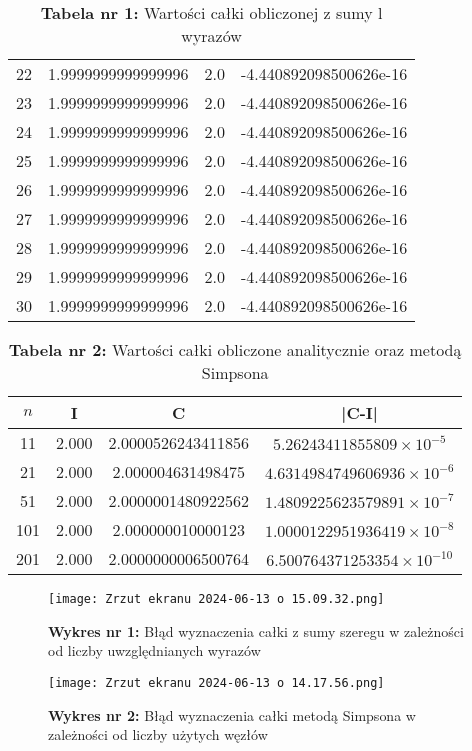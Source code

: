 \documentclass{article}
\begin{document}
\begin{table}[h!]
\begin{tabular}{cccc}
22 & 1.9999999999999996 & 2.0 & -4.440892098500626e-16 \\
23 & 1.9999999999999996 & 2.0 & -4.440892098500626e-16 \\
24 & 1.9999999999999996 & 2.0 & -4.440892098500626e-16 \\
25 & 1.9999999999999996 & 2.0 & -4.440892098500626e-16 \\
26 & 1.9999999999999996 & 2.0 & -4.440892098500626e-16 \\
27 & 1.9999999999999996 & 2.0 & -4.440892098500626e-16 \\
28 & 1.9999999999999996 & 2.0 & -4.440892098500626e-16 \\
29 & 1.9999999999999996 & 2.0 & -4.440892098500626e-16 \\
30 & 1.9999999999999996 & 2.0 & -4.440892098500626e-16 \\
\bottomrule
\end{tabular}
\caption*{\textbf{Tabela nr 1:} Wartości całki obliczonej z sumy l wyrazów}
\end{table}

\begin{table}[h!]
\centering
\begin{tabular}{cccc}
\toprule
\(n\) & I & C & |C-I| \\
\midrule
11 & 2.000 & 2.0000526243411856 & \(5.26243411855809 \times 10^{-5}\) \\
21 & 2.000 & 2.000004631498475 & \(4.6314984749606936 \times 10^{-6}\) \\
51 & 2.000 & 2.0000001480922562 & \(1.4809225623579891 \times 10^{-7}\) \\
101 & 2.000 & 2.000000010000123 & \(1.0000122951936419 \times 10^{-8}\) \\
201 & 2.000 & 2.0000000006500764 & \(6.500764371253354 \times 10^{-10}\) \\
\bottomrule
\end{tabular}
\caption*{\textbf{Tabela nr 2:} Wartości całki obliczone analitycznie oraz metodą Simpsona}
\end{table}

\begin{figure}[H]
    \centering
    \texttt{[image: Zrzut ekranu 2024-06-13 o 15.09.32.png]}
    \caption{\textbf{Wykres nr 1:} Błąd wyznaczenia całki z sumy szeregu w zależności od liczby uwzględnianych wyrazów}
    \label{fig:enter-label}
\end{figure}

\begin{figure}[H]
    \centering
    \texttt{[image: Zrzut ekranu 2024-06-13 o 14.17.56.png]}
    \caption*{\textbf{Wykres nr 2:} Błąd wyznaczenia całki metodą Simpsona w zależności od liczby użytych węzłów }
    \label{fig:enter-label}
\end{figure}
\end{document}
